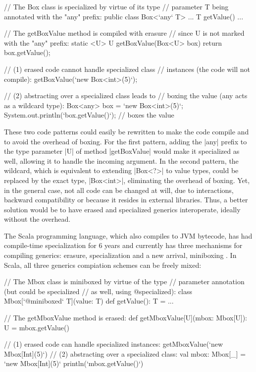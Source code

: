 \begin{lstlisting-nobreak}
// The Box class is specialized by virtue of its type
// parameter T being annotated with the "any" prefix:
public class Box<`any` T> {
  ...
  T getValue() { ... }
}

// The getBoxValue method is compiled with erasure
// since U is not marked with the "any" prefix:
static <U> U getBoxValue(Box<U> box) {
  return box.getValue();
}

// (1) erased code cannot handle specialized class
//        instances (the code will not compile):
getBoxValue(`new Box<int>(5)`);

// (2) abstracting over a specialized class leads to
//        boxing the value (any acts as a wildcard type):
Box<any> box = `new Box<int>(5)`;
System.out.println(`box.getValue()`); // boxes the value
\end{lstlisting-nobreak}

These two code patterns could easily be rewritten to make the code compile and to avoid the overhead of boxing. For the first pattern, adding the |any| prefix to the type parameter |U| of method |getBoxValue| would make it specialized as well, allowing it to handle the incoming argument. In the second pattern, the wildcard, which is equivalent to extending |Box<?>| to value types, could be replaced by the exact type, |Box<int>|, eliminating the overhead of boxing. Yet, in the general case, not all code can be changed at will, due to interactions, backward compatibility or because it resides in external libraries. Thus, a better solution would be to have erased and specialized generics interoperate, ideally without the overhead.


The Scala programming language, which also compiles to JVM bytecode, has had compile-time specialization for 6 years \cite{iuli-thesis, specialization-iuli} and currently has three mechanisms for compiling generics: erasure, specialization and a new arrival, miniboxing \cite{miniboxing}. In Scala, all three generics compiation schemes can be freely mixed:

\begin{lstlisting-nobreak}
// The Mbox class is miniboxed by virtue of the type
// parameter annotation (but could be specialized
// as well, using @specialized):
class Mbox[`@miniboxed` T](value: T) {
  def getValue(): T = ...
}

// The getMboxValue method is erased:
def getMboxValue[U](mbox: Mbox[U]): U = mbox.getValue()

// (1) erased code can handle specialized instances:
getMboxValue(`new Mbox[Int](5)`)
// (2) abstracting over a specialized class:
val mbox: Mbox[_] = `new Mbox[Int](5)`
println(`mbox.getValue()`)
\end{lstlisting-nobreak}

